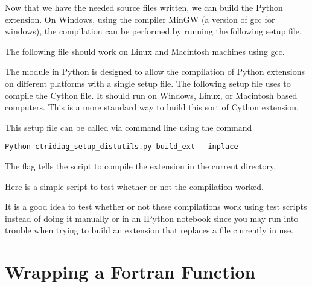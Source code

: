 

Now that we have the needed source files written, we can build the Python extension.
On Windows, using the compiler MinGW (a version of gcc for windows), the compilation can be performed by running the following setup file.



The following file should work on Linux and Macintosh machines using gcc.



The  module in Python is designed to allow the compilation of Python extensions on different platforms with a single setup file.
The following setup file uses  to compile the Cython file.
It should run on Windows, Linux, or Macintosh based computers.
This is a more standard way to build this sort of Cython extension.



This setup file can be called via command line using the command
\begin{lstlisting}[style=ShellInput]
Python ctridiag_setup_distutils.py build_ext --inplace
\end{lstlisting}
The  flag tells the script to compile the extension in the current directory.

Here is a simple script to test whether or not the compilation worked.



\begin{info}
It is a good idea to test whether or not these compilations work using test scripts instead of doing it manually or in an IPython notebook since you may run into trouble when trying to build an extension that replaces a file currently in use.
\end{info}

\section*{Wrapping a Fortran Function}


